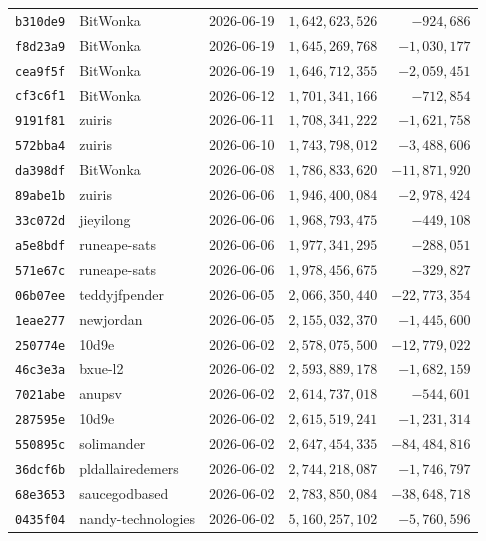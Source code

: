 {\begin{longtable}{@{}lllrr@{}}
\texttt{b310de9} & BitWonka & 2026-06-19 & $1{,}642{,}623{,}526$ & $-924{,}686$\\
\texttt{f8d23a9} & BitWonka & 2026-06-19 & $1{,}645{,}269{,}768$ & $-1{,}030{,}177$\\
\texttt{cea9f5f} & BitWonka & 2026-06-19 & $1{,}646{,}712{,}355$ & $-2{,}059{,}451$\\
\texttt{cf3c6f1} & BitWonka & 2026-06-12 & $1{,}701{,}341{,}166$ & $-712{,}854$\\
\texttt{9191f81} & zuiris & 2026-06-11 & $1{,}708{,}341{,}222$ & $-1{,}621{,}758$\\
\texttt{572bba4} & zuiris & 2026-06-10 & $1{,}743{,}798{,}012$ & $-3{,}488{,}606$\\
\texttt{da398df} & BitWonka & 2026-06-08 & $1{,}786{,}833{,}620$ & $-11{,}871{,}920$\\
\texttt{89abe1b} & zuiris & 2026-06-06 & $1{,}946{,}400{,}084$ & $-2{,}978{,}424$\\
\texttt{33c072d} & jieyilong & 2026-06-06 & $1{,}968{,}793{,}475$ & $-449{,}108$\\
\texttt{a5e8bdf} & runeape-sats & 2026-06-06 & $1{,}977{,}341{,}295$ & $-288{,}051$\\
\texttt{571e67c} & runeape-sats & 2026-06-06 & $1{,}978{,}456{,}675$ & $-329{,}827$\\
\texttt{06b07ee} & teddyjfpender & 2026-06-05 & $2{,}066{,}350{,}440$ & $-22{,}773{,}354$\\
\texttt{1eae277} & newjordan & 2026-06-05 & $2{,}155{,}032{,}370$ & $-1{,}445{,}600$\\
\texttt{250774e} & 10d9e & 2026-06-02 & $2{,}578{,}075{,}500$ & $-12{,}779{,}022$\\
\texttt{46c3e3a} & bxue-l2 & 2026-06-02 & $2{,}593{,}889{,}178$ & $-1{,}682{,}159$\\
\texttt{7021abe} & anupsv & 2026-06-02 & $2{,}614{,}737{,}018$ & $-544{,}601$\\
\texttt{287595e} & 10d9e & 2026-06-02 & $2{,}615{,}519{,}241$ & $-1{,}231{,}314$\\
\texttt{550895c} & solimander & 2026-06-02 & $2{,}647{,}454{,}335$ & $-84{,}484{,}816$\\
\texttt{36dcf6b} & pldallairedemers & 2026-06-02 & $2{,}744{,}218{,}087$ & $-1{,}746{,}797$\\
\texttt{68e3653} & saucegodbased & 2026-06-02 & $2{,}783{,}850{,}084$ & $-38{,}648{,}718$\\
\texttt{0435f04} & nandy-technologies & 2026-06-02 & $5{,}160{,}257{,}102$ & $-5{,}760{,}596$\\

\end{longtable}}
